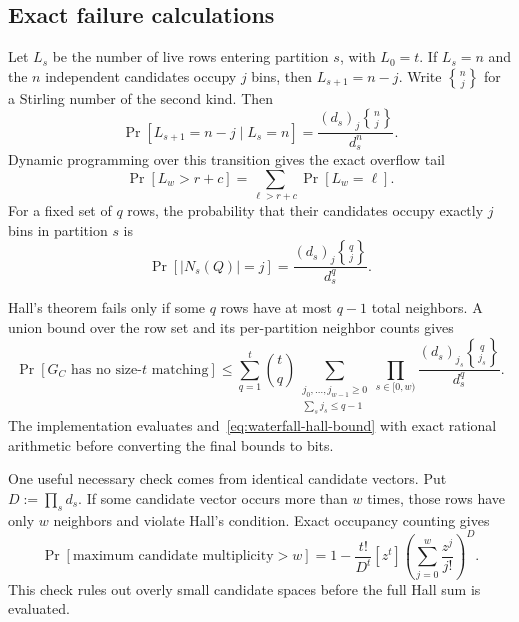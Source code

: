 \subsection{Exact failure calculations}

Let $L_s$ be the number of live rows entering partition $s$, with $L_0=t$.
If $L_s=n$ and the $n$ independent candidates occupy $j$ bins, then
$L_{s+1}=n-j$.  Write
$\genfrac\{\}{0pt}{}{n}{j}$ for a Stirling number of the second kind.  Then
\begin{equation}\label{eq:waterfall-occupancy-transition}
 \Pr[L_{s+1}=n-j\mid L_s=n]
 =\frac{(d_s)_j\genfrac\{\}{0pt}{}{n}{j}}{d_s^n}.
\end{equation}
Dynamic programming over this transition gives the exact overflow tail
\begin{equation}\label{eq:waterfall-overflow-tail}
 \Pr[L_w>r+c]=\sum_{\ell>r+c}\Pr[L_w=\ell].
\end{equation}
For a fixed set of $q$ rows, the probability that their candidates occupy
exactly $j$ bins in partition $s$ is
\begin{equation}\label{eq:waterfall-fixed-set-occupancy}
 \Pr[|N_s(Q)|=j]
 =\frac{(d_s)_j\genfrac\{\}{0pt}{}{q}{j}}{d_s^q}.
\end{equation}

Hall's theorem fails only if some $q$ rows have at most $q-1$ total neighbors.
A union bound over the row set and its per-partition neighbor counts gives
\begin{equation}\label{eq:waterfall-hall-bound}
 \Pr[G_C\text{ has no size-$t$ matching}]
 \leq\sum_{q=1}^{t}\binom tq
 \sum_{\substack{j_0,\ldots,j_{w-1}\geq0\\
                  \sum_sj_s\leq q-1}}
 \prod_{s\in[0,w)}
 \frac{(d_s)_{j_s}\genfrac\{\}{0pt}{}{q}{j_s}}{d_s^q}.
\end{equation}
The implementation evaluates 
and~\eqref{eq:waterfall-hall-bound} with exact rational arithmetic before
converting the final bounds to bits.

One useful necessary check comes from identical candidate vectors.  Put
$D:=\prod_sd_s$.  If some candidate vector occurs more than $w$ times, those
rows have only $w$ neighbors and violate Hall's condition.  Exact occupancy
counting gives
\begin{equation}\label{eq:waterfall-identical-candidate-probability}
 \Pr[\text{maximum candidate multiplicity}>w]
 =1-\frac{t!}{D^t}[z^t]
 \left(\sum_{j=0}^{w}\frac{z^j}{j!}\right)^D.
\end{equation}
This check rules out overly small candidate spaces before the full Hall sum is
evaluated.

